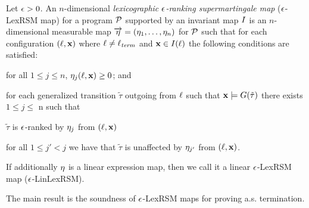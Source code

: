 \begin{definition}
Let $\epsilon>0$. An $n$-dimensional \emph{lexicographic $\epsilon$-ranking 
supermartingale map} ($\epsilon$-LexRSM map) for a program $\mathcal{P}$ supported by 
an invariant map $I$ is an $n$-dimensional measurable map 
$\overrightarrow{\eta}=(\eta_1,\dots,\eta_n)$ for $\mathcal{P}$ such that for each 
configuration $(\ell,\mathbf{x})$ where $\ell\neq \ell_{\mathit{term}}$ and $\mathbf{x}\in 
I(\ell)$ the following conditions are satisfied:
 \begin{compactitem}
 	\item
 	for all $1\leq j \leq n$, $\eta_j(\ell,\mathbf{x})\geq 0$; and
 	\item 
 	for each generalized transition $\tilde{\tau}$ outgoing from $\ell$ such that $\mathbf{x}\models G(\tilde\tau)$ there 
 	exists $1\leq j 
 	\leq$ n such that
 	\begin{compactitem}
 	\item
 	$\tilde{\tau}$ is $\epsilon$-ranked by $\eta_j$ from $(\ell,\mathbf{x})$
 	\item
 	for all $1\leq j'<j$ we have that $\tilde{\tau}$ is unaffected by 
 	$\eta_{j'}$ from $(\ell,\mathbf{x})$.
 	\end{compactitem}
 \end{compactitem}
If additionally $\eta$ is a linear expression map, then we call it a linear $\epsilon$-LexRSM map ($\epsilon$-LinLexRSM).
\end{definition}


The main result is the soundness of $\epsilon$-LexRSM maps for proving a.s. 
termination.

